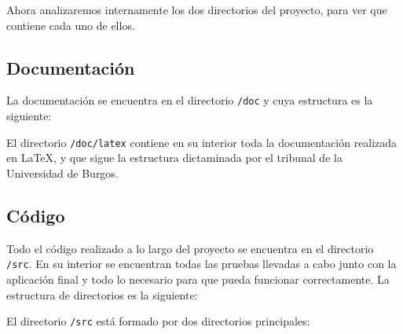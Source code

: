 Ahora analizaremos internamente los dos directorios del proyecto, para ver que contiene cada uno de ellos.

\subsection{Documentación}
La documentación se encuentra en el directorio \texttt{/doc} y cuya estructura es la siguiente:


El directorio \texttt{/doc/latex} contiene en su interior toda la documentación realizada en \LaTeX, y que sigue la estructura dictaminada por el tribunal de la Universidad de Burgos. 

\subsection{Código}
Todo el código realizado a lo largo del proyecto se encuentra en el directorio \texttt{/src}. En su interior se encuentran todas las pruebas llevadas a cabo junto con la aplicación final y todo lo necesario para que pueda funcionar correctamente. La estructura de directorios es la siguiente:


El directorio \texttt{/src} está formado por dos directorios principales:

